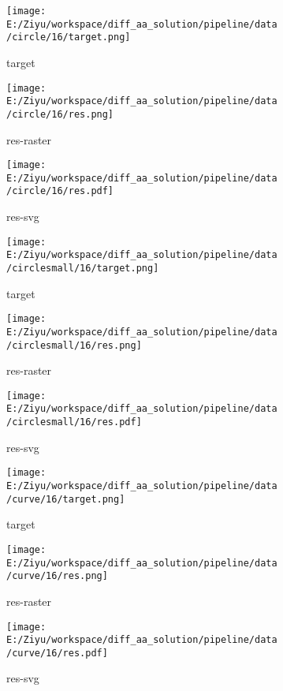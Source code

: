 \documentclass{article}%
\begin{document}
%


\begin{figure}[H]%
\begin{subfigure}[b]{0.32\linewidth}%
\texttt{[image: E:/Ziyu/workspace/diff\_aa\_solution/pipeline/data/circle/16/target.png]}%
\caption{target}%
\end{subfigure}%
\begin{subfigure}[b]{0.32\linewidth}%
\texttt{[image: E:/Ziyu/workspace/diff\_aa\_solution/pipeline/data/circle/16/res.png]}%
\caption{res{-}raster}%
\end{subfigure}%
\begin{subfigure}[b]{0.32\linewidth}%
\texttt{[image: E:/Ziyu/workspace/diff\_aa\_solution/pipeline/data/circle/16/res.pdf]}%
\caption{res{-}svg}%
\end{subfigure}%
\par\vspace{1em}%
\caption{}%
\clearpage%
\end{figure}

%


\begin{figure}[H]%
\begin{subfigure}[b]{0.32\linewidth}%
\texttt{[image: E:/Ziyu/workspace/diff\_aa\_solution/pipeline/data/circlesmall/16/target.png]}%
\caption{target}%
\end{subfigure}%
\begin{subfigure}[b]{0.32\linewidth}%
\texttt{[image: E:/Ziyu/workspace/diff\_aa\_solution/pipeline/data/circlesmall/16/res.png]}%
\caption{res{-}raster}%
\end{subfigure}%
\begin{subfigure}[b]{0.32\linewidth}%
\texttt{[image: E:/Ziyu/workspace/diff\_aa\_solution/pipeline/data/circlesmall/16/res.pdf]}%
\caption{res{-}svg}%
\end{subfigure}%
\par\vspace{1em}%
\caption{}%
\end{figure}

%


\begin{figure}[H]%
\begin{subfigure}[b]{0.32\linewidth}%
\texttt{[image: E:/Ziyu/workspace/diff\_aa\_solution/pipeline/data/curve/16/target.png]}%
\caption{target}%
\end{subfigure}%
\begin{subfigure}[b]{0.32\linewidth}%
\texttt{[image: E:/Ziyu/workspace/diff\_aa\_solution/pipeline/data/curve/16/res.png]}%
\caption{res{-}raster}%
\end{subfigure}%
\begin{subfigure}[b]{0.32\linewidth}%
\texttt{[image: E:/Ziyu/workspace/diff\_aa\_solution/pipeline/data/curve/16/res.pdf]}%
\caption{res{-}svg}%
\end{subfigure}%
\par\vspace{1em}%
\caption{}%
\end{figure}
\end{document}
